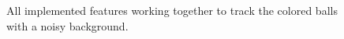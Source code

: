 \documentclass{sciposter}
\begin{document}
\begin{multicols}{3}
\begin{figure}[!h]
	\centering
			\setlength{\fboxsep}{1pt}
			\setlength{\fboxrule}{1pt}
	\caption{All implemented features working together to track the colored balls with a noisy background.}
	\label{fig:miguel_1}
\end{figure}


\end{multicols}
\end{document}
